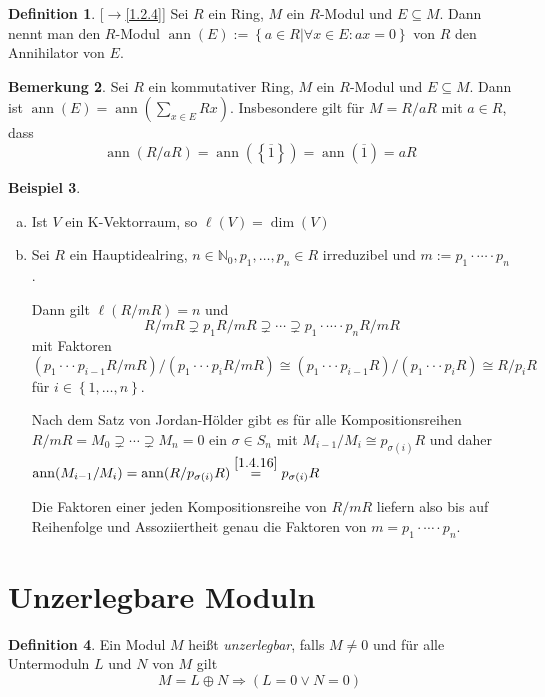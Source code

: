 \documentclass[
twoside=semi,
fontsize=12,
DIV=12, 
cleardoublepage=current,
leqno,
headings=optiontoheadandtoc, 
toc=idx
]{scrbook}
\newcommand{\N}{\mathbb{N}}
\newcommand{\brac}[1]{\left( #1 \right)}
\newcommand{\set}[1]{\left\{ #1 \right\}}
\DeclareMathOperator{\ann}{ann}
\theoremstyle{definition}
\newtheorem{definition}{Definition}[section]
\newtheorem{bemerkung}[definition]{Bemerkung}
\newtheorem{beispiel}[definition]{Beispiel}
\begin{document}
	\begin{definition}\label{1.4.15}
		[$\rightarrow$\ref{1.2.4}]\newline
		Sei $R$ ein Ring, $M$ ein $R$-Modul und $E\subseteq M$. Dann nennt man den $R$-Modul $\ann(E) := \set{a \in R|\forall x \in E: ax = 0}$ von $R$ den Annihilator von $E$.
	\end{definition}

	\begin{bemerkung}\label{1.4.16}
		Sei $R$ ein kommutativer Ring, $M$ ein $R$-Modul und $E\subseteq M$. Dann ist $\ann(E)=\ann\brac{\sum_{x\in E} Rx}$. Insbesondere gilt f\"ur $M=R/aR$ mit $a \in R$, dass
			\[\ann(R/aR) = \ann(\set{\overline{1}}) = \ann(\overline{1}) = aR\]
	\end{bemerkung}

	\begin{beispiel}\label{1.4.17}
		\begin{enumerate}[(a)]
			\item Ist $V$ ein K-Vektorraum, so $\ell(V) = \dim(V)$
			\item Sei $R$ ein Hauptidealring, $n\in\N_0, p_1, \dots, p_n \in R$ irreduzibel und $m:= p_1 \cdot \cdots \cdot p_n$.
			
			Dann gilt $\ell(R/mR) = n$ und 
				\[R/mR \supsetneq p_1R/mR \supsetneq \cdots \supsetneq p_1\cdot\cdots\cdot p_nR/mR\]
			mit Faktoren $(p_1\cdot \cdot \cdot p_{i-1}R/mR)/(p_1\cdot \cdot \cdot p_iR/mR) \cong (p_1\cdot \cdot \cdot p_{i-1}R)/(p_1\cdot \cdot \cdot p_iR) \cong R/p_iR$
			f\"ur $i \in \set{1,\dots,n}$.
			
			\noindent Nach dem Satz von Jordan-H\"older gibt es f\"ur alle Kompositionsreihen $R/mR = M_0 \supsetneq \cdots \supsetneq M_n = 0$ ein $\sigma \in S_n$ mit $M_{i-1}/M_i \cong p_{\sigma(i)}R$ und daher $\ann(M_{i-1}/M_i) = \ann(R/p_{\sigma(i)}R) \overset{\ref{1.4.16}}{=}p_{\sigma(i)}R$
			
			Die Faktoren einer jeden Kompositionsreihe von $R/mR$ liefern also bis auf Reihenfolge und Assoziiertheit genau die Faktoren von $m = p_1 \cdot \cdots \cdot p_n$.
  		\end{enumerate}
	\end{beispiel}

	\newpage
	\section{Unzerlegbare Moduln}
	\begin{definition}\label{1.5.1}
		Ein Modul $M$ hei\ss t \emph{unzerlegbar}, falls $M \neq 0$ und f\"ur alle Untermoduln $L$ und $N$ von $M$ gilt 
			\[M = L\oplus N \Rightarrow (L = 0 \lor N = 0)\]
	\end{definition}
\end{document}
